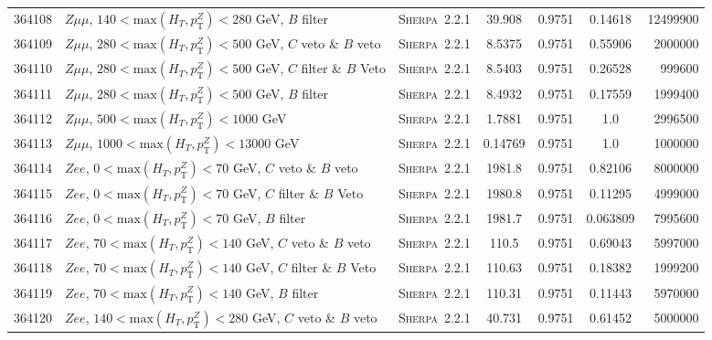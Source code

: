 \begin{table}[!htb]
{\begin{tabular}{|c|l|c|c|c|c|r|}
      364108 & $Z \mu\mu $, $140<\text{max}(H_T,p_{\text{T}}^Z)<280$ GeV, $B$ filter & \textsc{Sherpa}~2.2.1 &              39.908      & 0.9751& 0.14618 & 12499900\\
      364109 & $Z \mu\mu $, $280<\text{max}(H_T,p_{\text{T}}^Z)<500$ GeV, $C$ veto \& $B$ veto & \textsc{Sherpa}~2.2.1 &    8.5375      & 0.9751& 0.55906 &  2000000\\
      364110 & $Z \mu\mu $, $280<\text{max}(H_T,p_{\text{T}}^Z)<500$ GeV, $C$ filter \& $B$ Veto & \textsc{Sherpa}~2.2.1 &  8.5403      & 0.9751& 0.26528 &   999600\\
      364111 & $Z \mu\mu $, $280<\text{max}(H_T,p_{\text{T}}^Z)<500$ GeV, $B$ filter & \textsc{Sherpa}~2.2.1 &              8.4932      & 0.9751& 0.17559 &  1999400\\
      364112 & $Z \mu\mu $, $500<\text{max}(H_T,p_{\text{T}}^Z)<1000$ GeV                      & \textsc{Sherpa}~2.2.1 &    1.7881      & 0.9751& 1.0     &  2996500\\
      364113 & $Z \mu\mu $, $1000<\text{max}(H_T,p_{\text{T}}^Z)<13000$ GeV                      & \textsc{Sherpa}~2.2.1 &  0.14769     & 0.9751& 1.0     &  1000000\\     
      \hline
      364114 & $Z ee $, $0<\text{max}(H_T,p_{\text{T}}^Z)<70$ GeV, $C$ veto \& $B$ veto & \textsc{Sherpa}~2.2.1 &        1981.8            & 0.9751& 0.82106 &    8000000\\
      364115 & $Z ee $, $0<\text{max}(H_T,p_{\text{T}}^Z)<70$ GeV, $C$ filter \& $B$ Veto & \textsc{Sherpa}~2.2.1 &      1980.8            & 0.9751& 0.11295 &    4999000\\
      364116 & $Z ee $, $0<\text{max}(H_T,p_{\text{T}}^Z)<70$ GeV, $B$ filter & \textsc{Sherpa}~2.2.1 &                  1981.7            & 0.9751& 0.063809&    7995600\\
      364117 & $Z ee $, $70<\text{max}(H_T,p_{\text{T}}^Z)<140$ GeV, $C$ veto \& $B$ veto & \textsc{Sherpa}~2.2.1 &      110.5             & 0.9751& 0.69043 &    5997000\\
      364118 & $Z ee $, $70<\text{max}(H_T,p_{\text{T}}^Z)<140$ GeV, $C$ filter \& $B$ Veto & \textsc{Sherpa}~2.2.1 &    110.63            & 0.9751& 0.18382 &    1999200\\
      364119 & $Z ee $, $70<\text{max}(H_T,p_{\text{T}}^Z)<140$ GeV, $B$ filter & \textsc{Sherpa}~2.2.1 &                110.31            & 0.9751& 0.11443 &    5970000\\
      364120 & $Z ee $, $140<\text{max}(H_T,p_{\text{T}}^Z)<280$ GeV, $C$ veto \& $B$ veto & \textsc{Sherpa}~2.2.1 &     40.731            & 0.9751& 0.61452 &    5000000\\

\end{tabular}}
\end{table}
